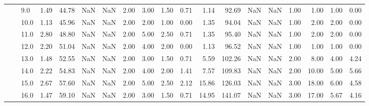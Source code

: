 \begin{tabular}{lllrrrrrrrrrrrrrrrr}
       &     & 9.0  &      1.49 &      44.78 &               NaN &                NaN &  2.00 &   3.00 &             1.50 &                         0.71 &      1.14 &      92.69 &               NaN &                NaN & 1.00 &   1.00 &             1.00 &                         0.00 \\
       &     & 10.0 &      1.13 &      45.96 &               NaN &                NaN &  2.00 &   2.00 &             1.00 &                         0.00 &      1.35 &      94.04 &               NaN &                NaN & 1.00 &   2.00 &             2.00 &                         0.00 \\
       &     & 11.0 &      2.80 &      48.80 &               NaN &                NaN &  2.00 &   5.00 &             2.50 &                         0.71 &      1.35 &      95.40 &               NaN &                NaN & 1.00 &   2.00 &             2.00 &                         0.00 \\
       &     & 12.0 &      2.20 &      51.04 &               NaN &                NaN &  2.00 &   4.00 &             2.00 &                         0.00 &      1.13 &      96.52 &               NaN &                NaN & 1.00 &   1.00 &             1.00 &                         0.00 \\
       &     & 13.0 &      1.48 &      52.55 &               NaN &                NaN &  2.00 &   3.00 &             1.50 &                         0.71 &      5.59 &     102.26 &               NaN &                NaN & 2.00 &   8.00 &             4.00 &                         4.24 \\
       &     & 14.0 &      2.22 &      54.83 &               NaN &                NaN &  2.00 &   4.00 &             2.00 &                         1.41 &      7.57 &     109.83 &               NaN &                NaN & 2.00 &  10.00 &             5.00 &                         5.66 \\
       &     & 15.0 &      2.67 &      57.60 &               NaN &                NaN &  2.00 &   5.00 &             2.50 &                         2.12 &     15.86 &     126.03 &               NaN &                NaN & 3.00 &  18.00 &             6.00 &                         4.58 \\
       &     & 16.0 &      1.47 &      59.10 &               NaN &                NaN &  2.00 &   3.00 &             1.50 &                         0.71 &     14.95 &     141.07 &               NaN &                NaN & 3.00 &  17.00 &             5.67 &                         4.16 \\

\end{tabular}
